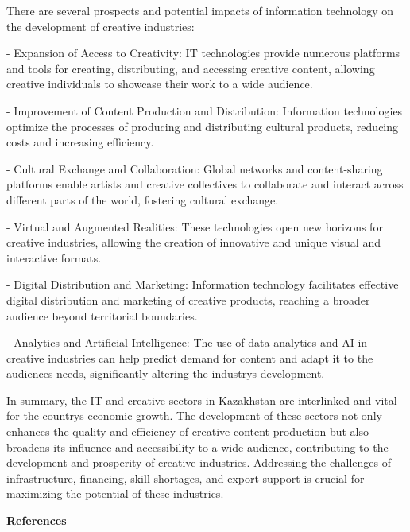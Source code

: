 There are several prospects and potential impacts of information
technology on the development of creative industries:

- Expansion of Access to Creativity: IT technologies provide numerous
platforms and tools for creating, distributing, and accessing creative
content, allowing creative individuals to showcase their work to a wide
audience.

- Improvement of Content Production and Distribution: Information
technologies optimize the processes of producing and distributing
cultural products, reducing costs and increasing efficiency.

- Cultural Exchange and Collaboration: Global networks and
content-sharing platforms enable artists and creative collectives to
collaborate and interact across different parts of the world, fostering
cultural exchange.

- Virtual and Augmented Realities: These technologies open new horizons
for creative industries, allowing the creation of innovative and unique
visual and interactive formats.

- Digital Distribution and Marketing: Information technology facilitates
effective digital distribution and marketing of creative products,
reaching a broader audience beyond territorial boundaries.

- Analytics and Artificial Intelligence: The use of data analytics and
AI in creative industries can help predict demand for content and adapt
it to the audience\textquotesingle s needs, significantly altering the
industry\textquotesingle s development.

In summary, the IT and creative sectors in Kazakhstan are interlinked
and vital for the country\textquotesingle s economic growth. The
development of these sectors not only enhances the quality and
efficiency of creative content production but also broadens its
influence and accessibility to a wide audience, contributing to the
development and prosperity of creative industries. Addressing the
challenges of infrastructure, financing, skill shortages, and export
support is crucial for maximizing the potential of these industries.

{\bfseries References}

